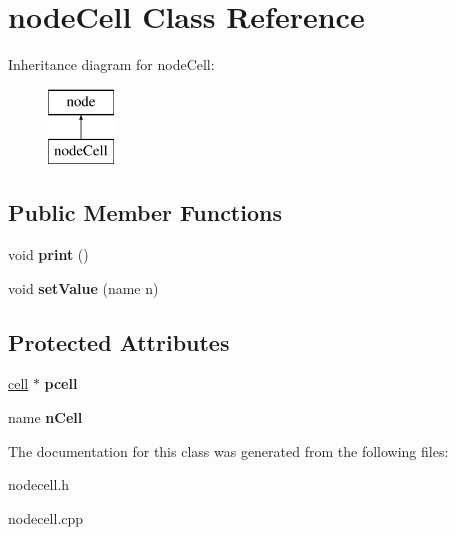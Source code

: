 \hypertarget{classnodeCell}{\section{node\-Cell \-Class \-Reference}
\label{classnodeCell}
}
\-Inheritance diagram for node\-Cell\-:\begin{figure}[H]
\begin{center}
\leavevmode
\includegraphics[height=2.000000cm]{classnodeCell}
\end{center}
\end{figure}
\subsection*{\-Public \-Member \-Functions}
\begin{DoxyCompactItemize}
\item 
\hypertarget{classnodeCell_aa06f75bfe669ec3b081d14a71c812665}{void {\bfseries print} ()}\label{classnodeCell_aa06f75bfe669ec3b081d14a71c812665}

\item 
\hypertarget{classnodeCell_a2c0efa99a60e3e056abec3349a7fb975}{void {\bfseries set\-Value} (name n)}\label{classnodeCell_a2c0efa99a60e3e056abec3349a7fb975}

\end{DoxyCompactItemize}
\subsection*{\-Protected \-Attributes}
\begin{DoxyCompactItemize}
\item 
\hypertarget{classnodeCell_adcf4cb3847b0cdd3d426361e22bb729e}{\hyperlink{classcell}{cell} $\ast$ {\bfseries pcell}}\label{classnodeCell_adcf4cb3847b0cdd3d426361e22bb729e}

\item 
\hypertarget{classnodeCell_a616720100bc0833475fa504ba19845d3}{name {\bfseries n\-Cell}}\label{classnodeCell_a616720100bc0833475fa504ba19845d3}

\end{DoxyCompactItemize}


\-The documentation for this class was generated from the following files\-:\begin{DoxyCompactItemize}
\item 
nodecell.\-h\item 
nodecell.\-cpp\end{DoxyCompactItemize}
